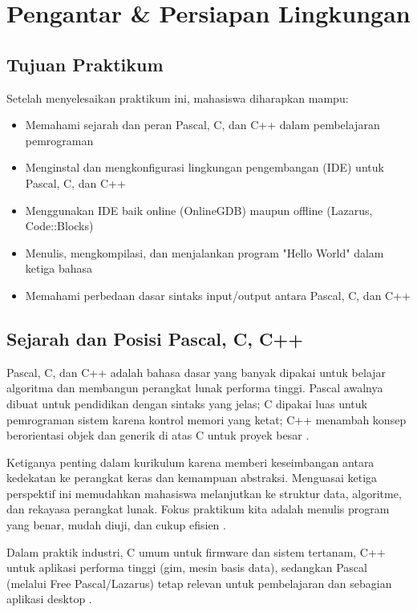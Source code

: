 \documentclass[../main.tex]{subfiles}
\begin{document}
\chapter{Pengantar \& Persiapan Lingkungan}

\section*{Tujuan Praktikum}
Setelah menyelesaikan praktikum ini, mahasiswa diharapkan mampu:
\begin{itemize}
  \item Memahami sejarah dan peran Pascal, C, dan C++ dalam pembelajaran pemrograman
  \item Menginstal dan mengkonfigurasi lingkungan pengembangan (IDE) untuk Pascal, C, dan C++
  \item Menggunakan IDE baik online (OnlineGDB) maupun offline (Lazarus, Code::Blocks)
  \item Menulis, mengkompilasi, dan menjalankan program "Hello World" dalam ketiga bahasa
  \item Memahami perbedaan dasar sintaks input/output antara Pascal, C, dan C++
\end{itemize}

\section{Sejarah dan Posisi Pascal, C, C++}
Pascal, C, dan C++ adalah bahasa dasar yang banyak dipakai untuk belajar algoritma dan membangun perangkat lunak performa tinggi. Pascal awalnya dibuat untuk pendidikan dengan sintaks yang jelas; C dipakai luas untuk pemrograman sistem karena kontrol memori yang ketat; C++ menambah konsep berorientasi objek dan generik di atas C untuk proyek besar \parencite{pascal-tutorial-wikibooks,gnu-c-manual,cpp-reference}.

Ketiganya penting dalam kurikulum karena memberi keseimbangan antara kedekatan ke perangkat keras dan kemampuan abstraksi. Menguasai ketiga perspektif ini memudahkan mahasiswa melanjutkan ke struktur data, algoritme, dan rekayasa perangkat lunak. Fokus praktikum kita adalah menulis program yang benar, mudah diuji, dan cukup efisien \parencite{free-pascal-docs,gnu-c-manual,cpp-reference}.

Dalam praktik industri, C umum untuk firmware dan sistem tertanam, C++ untuk aplikasi performa tinggi (gim, mesin basis data), sedangkan Pascal (melalui Free Pascal/Lazarus) tetap relevan untuk pembelajaran dan sebagian aplikasi desktop \parencite{free-pascal-docs}.
\end{document}
